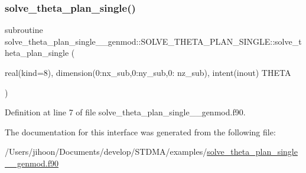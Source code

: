 \subsubsection{\texorpdfstring{solve\_theta\_plan\_single()}{solve\_theta\_plan\_single()}}
{\footnotesize\ttfamily subroutine solve\+\_\+theta\+\_\+plan\+\_\+single\+\_\+\+\_\+genmod\+::\+S\+O\+L\+V\+E\+\_\+\+T\+H\+E\+T\+A\+\_\+\+P\+L\+A\+N\+\_\+\+S\+I\+N\+G\+L\+E\+::solve\+\_\+theta\+\_\+plan\+\_\+single (\begin{DoxyParamCaption}\item[{real(kind=8), dimension(0\+:nx\+\_\+sub,0\+:ny\+\_\+sub,0\+: nz\+\_\+sub), intent(inout)}]{T\+H\+E\+TA }\end{DoxyParamCaption})}



Definition at line 7 of file solve\+\_\+theta\+\_\+plan\+\_\+single\+\_\+\+\_\+genmod.\+f90.



The documentation for this interface was generated from the following file\+:\begin{DoxyCompactItemize}
\item 
/\+Users/jihoon/\+Documents/develop/\+S\+T\+D\+M\+A/examples/\mbox{\hyperlink{solve__theta__plan__single____genmod_8f90}{solve\+\_\+theta\+\_\+plan\+\_\+single\+\_\+\+\_\+genmod.\+f90}}\end{DoxyCompactItemize}
